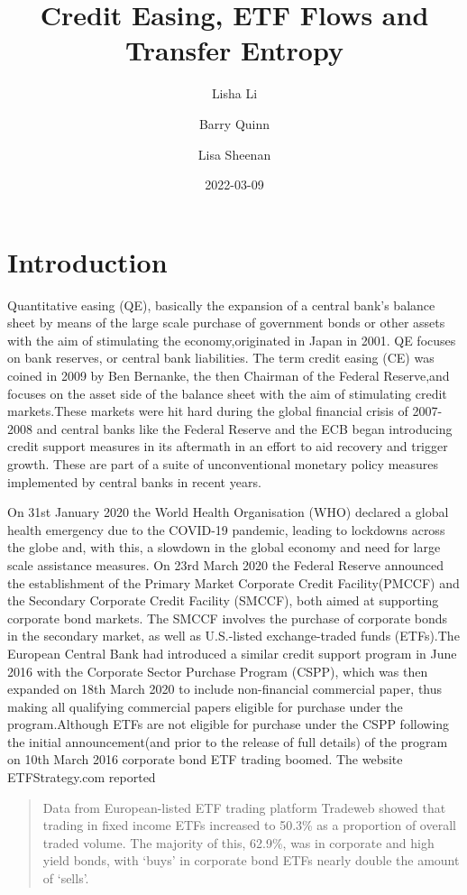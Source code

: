 \documentclass[
]{article}
\title{Credit Easing, ETF Flows and Transfer Entropy}
\author{Lisha Li \and Barry Quinn \and Lisa Sheenan}
\date{2022-03-09}
\begin{document}
\maketitle

\hypertarget{introduction}{%
\section{Introduction}\label{introduction}}

Quantitative easing (QE), basically the expansion of a central bank's
balance sheet by means of the large scale purchase of government bonds
or other assets with the aim of stimulating the economy,originated in
Japan in 2001. QE focuses on bank reserves, or central bank liabilities.
The term credit easing (CE) was coined in 2009 by Ben Bernanke, the then
Chairman of the Federal Reserve,and focuses on the asset side of the
balance sheet with the aim of stimulating credit markets.These markets
were hit hard during the global financial crisis of 2007-2008 and
central banks like the Federal Reserve and the ECB began introducing
credit support measures in its aftermath in an effort to aid recovery
and trigger growth. These are part of a suite of unconventional monetary
policy measures implemented by central banks in recent years.

On 31st January 2020 the World Health Organisation (WHO) declared a
global health emergency due to the COVID-19 pandemic, leading to
lockdowns across the globe and, with this, a slowdown in the global
economy and need for large scale assistance measures. On 23rd March 2020
the Federal Reserve announced the establishment of the Primary Market
Corporate Credit Facility(PMCCF) and the Secondary Corporate Credit
Facility (SMCCF), both aimed at supporting corporate bond markets. The
SMCCF involves the purchase of corporate bonds in the secondary market,
as well as U.S.-listed exchange-traded funds (ETFs).The European Central
Bank had introduced a similar credit support program in June 2016 with
the Corporate Sector Purchase Program (CSPP), which was then expanded on
18th March 2020 to include non-financial commercial paper, thus making
all qualifying commercial papers eligible for purchase under the
program.Although ETFs are not eligible for purchase under the CSPP
following the initial announcement(and prior to the release of full
details) of the program on 10th March 2016 corporate bond ETF trading
boomed. The website ETFStrategy.com reported

\begin{quote}
Data from European-listed ETF trading platform Tradeweb showed that
trading in fixed income ETFs increased to 50.3\% as a proportion of
overall traded volume. The majority of this, 62.9\%, was in corporate
and high yield bonds, with `buys' in corporate bond ETFs nearly double
the amount of `sells'.
\end{quote}
\end{document}
